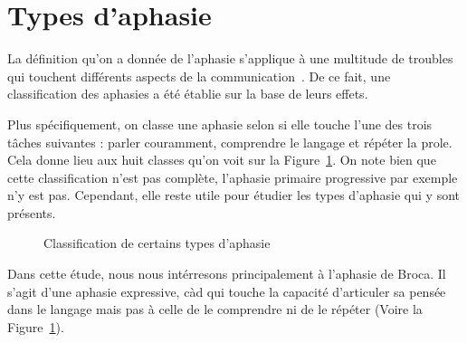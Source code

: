 \section{Types d'aphasie}

La définition qu'on a donnée de l'aphasie s'applique à une multitude de troubles  
qui touchent différents aspects de la communication~\cite[p. 135, 136]{Hallowell_2017}.
De ce fait, une classification des aphasies a été établie sur la base de leurs effets.

Plus spécifiquement, on classe une aphasie selon si elle touche l'une des trois tâches suivantes :
parler couramment, comprendre le langage et répéter la prole. 
Cela donne lieu aux huit classes qu'on voit sur la Figure~\ref{fig:aphasia-tree}.
On note  bien que cette classification n'est pas complète, l'aphasie primaire progressive par exemple n'y est pas.
Cependant, elle reste utile pour étudier les types d'aphasie qui y sont présents.


\begin{figure}[h]
    \begin{center}
        \resizebox{\textwidth}{!}{}
    \end{center}
    \caption[Classification de certains types d'aphasie]
    {Classification de certains types d'aphasie~\cite{Sreedharan_2018}}
    \label{fig:aphasia-tree}
\end{figure}

Dans cette étude, nous nous intérresons principalement à l'aphasie de Broca.
Il s'agit d'une aphasie expressive, 
càd qui touche la capacité d'articuler sa pensée dans le langage mais pas
à celle de le comprendre ni de le répéter (Voire la Figure~\ref{fig:aphasia-tree}).